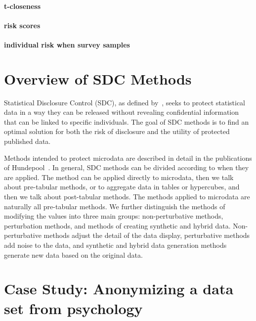 \documentclass{article}
\begin{document}
\paragraph{t-closeness}

\paragraph{risk scores}

\paragraph{individual risk when survey samples}

\section{Overview of SDC Methods}

Statistical Disclosure Control (SDC), as defined by~\cite{2012_Hundepool}, seeks to protect statistical data in a way they can be released without revealing confidential information that can be linked to specific individuals. The goal of SDC methods is to find an optimal solution for both the risk of disclosure and the utility of protected published data.

Methods intended to protect microdata are described in detail in the publications of Hundepool~\cite{2012_Hundepool}. In general, SDC methods can be divided according to when they are applied. The method can be applied directly to microdata, then we talk about pre-tabular methods, or to aggregate data in tables or hypercubes, and then we talk about post-tabular methods. The methods applied to microdata are naturally all pre-tabular methods.
We further distinguish the methods of modifying the values into three main groups: non-perturbative methods, perturbation methods, and methods of creating synthetic and hybrid data. Non-perturbative methods adjust the detail of the data display, perturbative methods add noise to the data, and synthetic and hybrid data generation methods generate new data based on the original data. 
\newline

\section{Case Study: Anonymizing a data set from psychology}
\end{document}
